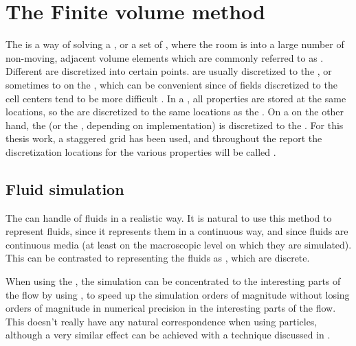 \chapter{The Finite volume method}
\label{chap:thefinitevolumemethod}



The \FVM is a way of solving a \PDE, or a set of \PDEs, where the room is \discretized into a large number of non-moving, adjacent volume elements which are commonly referred to as \cells. Different \properties are discretized into certain points.  are usually discretized to the , or sometimes to  on the , which can be convenient since \interpolation of fields discretized to the cell centers tend to be more difficult \citep{Losasso2004}. In a , all properties are stored at the same locations, so the  are discretized to the same locations as the . On a  on the other hand, the \velocity (or the \momentum, depending on implementation) is discretized to the . For this thesis work, a staggered grid has been used, and throughout the report the discretization locations for the various properties will be called .

\section{Fluid simulation}

The \FVM can handle \simulation of fluids in a realistic way. It is natural to use this method to represent fluids, since it represents them in a continuous way, and since fluids are continuous media (at least on the macroscopic level on which they are simulated). This can be contrasted to representing the fluids as , which are discrete.

When using the \FVM, the simulation can be concentrated to the interesting parts of the flow by using  \citep{Popinet2003,Losasso2004}, to speed up the simulation orders of magnitude without losing orders of magnitude in numerical precision in the interesting parts of the flow. This doesn't really have any natural correspondence when using particles, although a very similar effect can be achieved with a technique discussed in .

